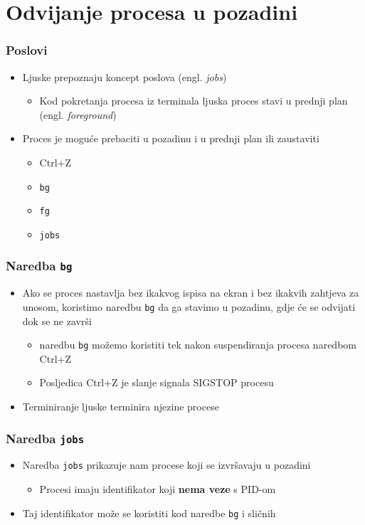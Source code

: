 \documentclass[table,usenames,dvipsnames]{beamer}
\newcommand{\shell}[1]{\texttt{#1}}
\begin{document}
\section{Odvijanje procesa u pozadini}
\begin{frame}[t]
\frametitle{Poslovi}
\begin{itemize}
  \item Ljuske prepoznaju koncept poslova (engl. \emph{jobs})
  \begin{itemize}
    \item Kod pokretanja procesa iz terminala ljuska proces stavi u prednji 
          plan (engl. \emph{foreground})
  \end{itemize}
  \item Proces je moguće prebaciti u pozadinu i u prednji plan ili zaustaviti
  \begin{itemize}
    \item[] Ctrl+Z
    \item[] \shell{bg}
    \item[] \shell{fg}
    \item[] \shell{jobs}
  \end{itemize}
\end{itemize}
\end{frame}

\begin{frame}[t]
\frametitle{Naredba \shell{bg}}
\begin{itemize}
  \item Ako se proces nastavlja bez ikakvog ispisa na ekran i bez ikakvih 
        zahtjeva za unosom, koristimo naredbu \shell{bg} da ga stavimo u 
        pozadinu, gdje će se odvijati dok se ne završi
  \begin{itemize}
    \item naredbu \shell{bg} možemo koristiti tek nakon suspendiranja procesa 
          naredbom Ctrl+Z
    \item Posljedica Ctrl+Z je slanje signala SIGSTOP procesu
  \end{itemize}
  \item Terminiranje ljuske terminira njezine procese
\end{itemize}
\end{frame}

\begin{frame}[t]
\frametitle{Naredba \shell{jobs}}
\begin{itemize}
  \item Naredba \shell{jobs} prikazuje nam procese koji se izvršavaju u pozadini
  \begin{itemize}
    \item Procesi imaju identifikator koji \textbf{nema veze} s PID-om
  \end{itemize}
  \item Taj identifikator može se koristiti kod naredbe \shell{bg} i sličnih
\end{itemize}
\end{frame}
\end{document}
